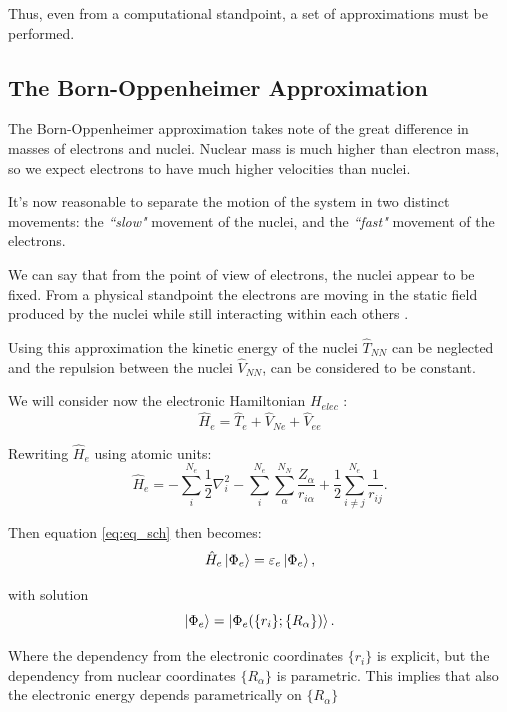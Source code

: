 \documentclass[a4paper,12pt]{article}
\begin{document}
Thus, even from a computational standpoint, a set of approximations must be performed.


\subsection{The Born-Oppenheimer Approximation}

The Born-Oppenheimer approximation takes note of the great difference in masses of electrons and nuclei.
Nuclear mass is much higher than electron mass, so we expect electrons to have much higher velocities than	 nuclei. 

It's now reasonable to separate the motion of the system in two distinct movements: the \textit{``slow"} movement of the nuclei, and the \textit{``fast"} movement of the electrons.

We can say that from the point of view of electrons, the nuclei appear to be fixed. 
From a physical standpoint the electrons are moving in the static field produced by the nuclei while still interacting within each others \cite[p.241]{Atkins}.


Using this approximation the kinetic energy of the nuclei $\hat{T}_{NN}$ can be neglected and the repulsion between the nuclei $\hat{V}_{NN}$, can be considered to be constant.

We will consider now the electronic Hamiltonian $H_{elec}$ :
\begin{equation}
	\hat{H}_{e} = \hat{T}_{e} + \hat{V}_{Ne} + \hat{V}_{ee}
\end{equation}

Rewriting $\hat{H}_{e}$  using atomic units:
\begin{equation}\label{eq:H_elec}
	\hat{H}_{e} = 	- \sum_{i}^{N_{e}} \frac{1}{2} \nabla_{i}^2  
					- \sum_{i}^{N_{e}} \sum_{\alpha}^{N_{N}} \frac{Z_{\alpha}}{r_{i\alpha}}  
					+ \frac{1}{2} \sum_{i \neq j}^{N_{e}} \frac{1}{r_{ij}}.
\end{equation}

Then equation \eqref{eq:eq_sch} then becomes:
\begin{equation}
	\hat{H}_{e} \ket{\Phi_{e}} = \varepsilon_{e} \ket{\Phi_{e}},
\end{equation}

with solution
\begin{equation}
	\ket{\Phi_{e}} = \ket{\Phi_{e}( \{r_{i}\};\{R_{\alpha}\} )}.
\end{equation}

Where the dependency from the electronic coordinates $\{r_i\}$ is explicit, but the dependency from nuclear coordinates $\{R_{\alpha}\}$ is parametric.
This implies that also the electronic energy depends parametrically on $\{R_{\alpha}\}$
\end{document}
